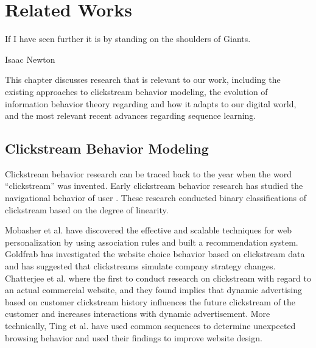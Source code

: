 \section{Related Works}
\label{ch:relate}
\epigraph{If I have seen further it is by standing on the shoulders of Giants.}{Isaac Newton}


This chapter discusses research that is relevant to our work, including
the existing approaches to clickstream behavior modeling, the evolution of information 
behavior theory regarding and how it adapts to our digital world, and the 
most relevant recent advances regarding sequence learning.

\subsection{Clickstream Behavior Modeling}

Clickstream behavior research can be traced back to the year when the word ``clickstream''
was invented. Early clickstream behavior research has studied the navigational behavior
of user \cite{mandese1995clickstreams, brodwin1995}.
These research conducted binary classifications of clickstream based on the degree of linearity.

Mobasher et al. have discovered the effective and scalable techniques \cite{Mobasher:2001:EPB:502932.502935} 
for web personalization by using association rules and built a recommendation system. 
Goldfrab has investigated \cite{goldfarb2002analyzing} the website choice behavior based on 
clickstream data and has suggested that clickstreams simulate company strategy changes.
Chatterjee et al. \cite{chatterjee2003modeling} where the first to conduct 
research on clickstream with regard to an actual commercial website, 
and they found implies that dynamic advertising
based on customer clickstream history influences the future clickstream of the customer
and increases interactions with dynamic advertisement.
More technically, Ting et al. have used common sequences to determine 
unexpected browsing behavior \cite{Ting:2005:UMF:1092358.1092469}
and used their findings to improve website design. 

